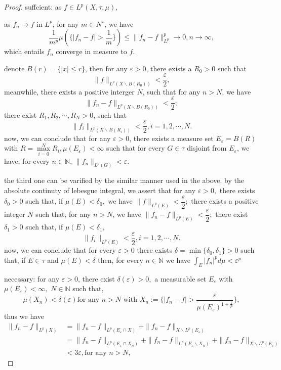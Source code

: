\begin{proof}
	suffcient: as $ f\in L^p(X, \tau, \mu) $,
	
	as $ f_n \rightarrow f $ in $ L^p $, for any $ m\in N^\star $, we have $$\frac{1}{m^p} \mu(\{|f_n-f|>\frac{1}{m}\}) \leqslant \|f_n-f\|_{L^p}^p\rightarrow 0, n\rightarrow\infty,$$
	which entails $ f_n $ converge in measure to $ f $.
	
	denote $ B(r) = \{|x|\leqslant r\} $, then for any $ \varepsilon>0 $, there exists a $R_0>0$ such that \[ \|f\|_{L^p(X\backslash B(R_0))} < \frac{\varepsilon}{2},\]
	meanwhile, there exists a positive interger $ N $, such that for any $ n>N $, we have 
	\[ \|f_n-f\|_{L^p(X\backslash B(R_0))} < \frac{\varepsilon}{2};\]
	there exist $ R_1, R_2, \cdots, R_N > 0 $, such that 
	\[ \|f_i\|_{L^p(X\backslash B(R_i))} < \frac{\varepsilon}{2}, i = 1, 2, \cdots, N.\]
	now, we can conclude that for any $ \varepsilon>0 $, there exists a measure set $ E_\varepsilon = B(R)$ with $ R = \max\limits_{i=0}^N R_i,\mu(E_\varepsilon)<\infty $ such that for every $ G\in\tau $ disjoint from $ E_\varepsilon $, we have, for every $ n\in \mathbb{N} $, $ \|f_n\|_{L^p(G)}<\varepsilon $.
	
	the third one can be varified by the similar manner used in the above. by the absolute continuty of lebesgue integral, we assert that for any $ \varepsilon>0, $ there exists $ \delta_0>0 $ such that, if $ \mu(E)<\delta_0, $ we have $ \|f\|_{L^p(E)} < \dfrac\varepsilon2; $ there exists a positive integer $ N $ such that, for any $ n>N $, we have $ \|f_n-f\|_{L^p(E)} < \dfrac{\varepsilon}{2};$ there exist $ \delta_1 > 0  $ such that, if $ \mu(E)< \delta_1, $ 
	\[ \|f_i\|_{L^p(E)} < \frac{\varepsilon}{2}, i = 1, 2, \cdots, N.\]
	now, we can conclude that for  every $\varepsilon>0$ there exists $\delta=\min\{\delta_0, \delta_1\}>0$ such that, if $E \in \tau$ and $\mu(E)<\delta$ then, for every $n \in \mathbb{N}$ we have $\int_{E}\left|f_{n}\right|^{p} d \mu<\varepsilon^{p}$	
	
	necessary: for any $ \varepsilon>0 $, there exist $ \delta(\varepsilon)>0,$ a measurable set $ E_\varepsilon $ with $ \mu(E_\varepsilon)<\infty, $ $N\in\mathbb{N}$ such that, 
	\[ \mu(X_n) < \delta(\varepsilon) \text{for any } n > N \text{ with } X_n:=\{|f_n-f|>\dfrac{\varepsilon}{\mu(E_\varepsilon)^{1+\frac{1}{p}}}\},\]
	thus we have
	\begin{equation*}
		\begin{split}
			\|f_n-f\|_{L^p(X)} &= \|f_n-f\|_{L^p(E_\varepsilon\cap X)} + \|f_n-f\|_{X\backslash L^p(E_\varepsilon)}\\
			&= \|f_n-f\|_{L^p(E_\varepsilon\cap X_n)} + \|f_n-f\|_{L^p(E_\varepsilon\backslash X_n)} +
			\|f_n-f\|_{X\backslash L^p(E_\varepsilon)}\\
			&< 3\varepsilon, \text{for any } n>N,
		\end{split}
	\end{equation*}
\end{proof}


